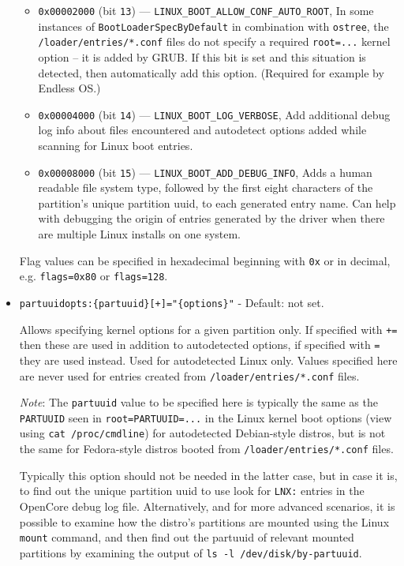 \documentclass[]{article}
\begin{document}
\begin{itemize}
\begin{itemize}
	  \item \texttt{0x00002000} (bit \texttt{13}) --- \texttt{LINUX\_BOOT\_ALLOW\_CONF\_AUTO\_ROOT},
	  In some instances of \texttt{BootLoaderSpecByDefault} in combination with \texttt{ostree}, the
    \texttt{/loader/entries/*.conf} files do not specify a required \texttt{root=...} kernel
    option -- it is added by GRUB. If this bit is set and this situation is detected, then
    automatically add this option. (Required for example by Endless OS.)
	  \item \texttt{0x00004000} (bit \texttt{14}) --- \texttt{LINUX\_BOOT\_LOG\_VERBOSE},
	  Add additional debug log info about files encountered and autodetect options added while scanning for
    Linux boot entries.
	  \item \texttt{0x00008000} (bit \texttt{15}) --- \texttt{LINUX\_BOOT\_ADD\_DEBUG\_INFO},
	  Adds a human readable file system type, followed by the first eight characters of the
	  partition's unique partition uuid, to each generated entry name. Can help with debugging
	  the origin of entries generated by the driver when there are multiple Linux installs on
	  one system.
  \end{itemize} \medskip

	Flag values can be specified in hexadecimal beginning with \texttt{0x} or in decimal,
  e.g. \texttt{flags=0x80} or \texttt{flags=128}. \medskip

	\item \texttt{partuuidopts:\{partuuid\}[+]="\{options\}"} - Default: not set. \medskip

  Allows specifying kernel options for a given partition only. If specified with \texttt{+=} then
  these are used in addition to autodetected options, if specified with \texttt{=} they are used instead.
  Used for autodetected Linux only. Values specified here are never used for entries created from
  \texttt{/loader/entries/*.conf} files.
  \medskip

  \emph{Note}: The \texttt{partuuid} value to be specified here is typically the same as the \texttt{PARTUUID}
  seen in \texttt{root=PARTUUID=...} in the Linux kernel boot options (view using
  \texttt{cat /proc/cmdline}) for autodetected Debian-style distros, but is not the same for
  Fedora-style distros booted from \texttt{/loader/entries/*.conf} files. \medskip

	Typically this option should not be needed in the latter case, but in case it is, to find out the unique
  partition uuid to use look for \texttt{LNX:} entries in the OpenCore debug log file. Alternatively, and
  for more advanced scenarios, it is possible to examine how the distro's partitions are mounted using the
  Linux \texttt{mount} command, and then find out the partuuid of relevant mounted partitions by examining the
  output of \texttt{ls -l /dev/disk/by-partuuid}. \medskip


\end{itemize}
\end{document}
